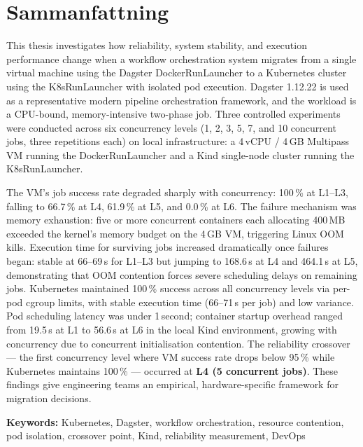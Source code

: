 
\chapter*{Sammanfattning}

This thesis investigates how reliability, system stability, and execution performance change when a workflow orchestration system migrates from a single virtual machine using the Dagster DockerRunLauncher to a Kubernetes cluster using the K8sRunLauncher with isolated pod execution. Dagster 1.12.22 is used as a representative modern pipeline orchestration framework, and the workload is a CPU-bound, memory-intensive two-phase job. Three controlled experiments were conducted across six concurrency levels (1, 2, 3, 5, 7, and 10 concurrent jobs, three repetitions each) on local infrastructure: a 4\,vCPU / 4\,GB Multipass VM running the DockerRunLauncher and a Kind single-node cluster running the K8sRunLauncher.

The VM's job success rate degraded sharply with concurrency: 100\,\% at L1--L3, falling to 66.7\,\% at L4, 61.9\,\% at L5, and 0.0\,\% at L6. The failure mechanism was memory exhaustion: five or more concurrent containers each allocating 400\,MB exceeded the kernel's memory budget on the 4\,GB VM, triggering Linux OOM kills. Execution time for surviving jobs increased dramatically once failures began: stable at 66--69\,s for L1--L3 but jumping to 168.6\,s at L4 and 464.1\,s at L5, demonstrating that OOM contention forces severe scheduling delays on remaining jobs. Kubernetes maintained 100\,\% success across all concurrency levels via per-pod cgroup limits, with stable execution time (66--71\,s per job) and low variance. Pod scheduling latency was under 1\,second; container startup overhead ranged from 19.5\,s at L1 to 56.6\,s at L6 in the local Kind environment, growing with concurrency due to concurrent initialisation contention. The reliability crossover --- the first concurrency level where VM success rate drops below 95\,\% while Kubernetes maintains 100\,\% --- occurred at \textbf{L4 (5 concurrent jobs)}. These findings give engineering teams an empirical, hardware-specific framework for migration decisions.

\vspace{1em}
\noindent\textbf{Keywords:} Kubernetes, Dagster, workflow orchestration, resource contention, pod isolation, crossover point, Kind, reliability measurement, DevOps

\clearpage
